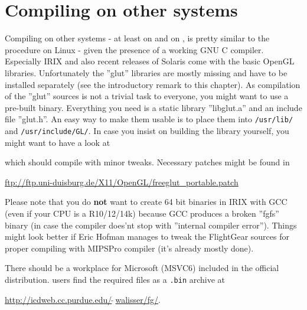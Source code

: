 \section{Compiling on other systems}

Compiling on other  systems - at least on  and on
, is pretty similar to the procedure on Linux - given the presence of a working GNU C compiler. Especially IRIX and also recent releases of Solaris come with the
basic OpenGL libraries. Unfortunately the ''glut'' libraries are
mostly missing and have to be installed separately (see the introductory remark to this chapter). As compilation
of the ''glut'' sources is not a trivial task to everyone, you might want to use a
pre-built binary. Everything you need is a static library ''libglut.a'' and an include
file ''glut.h''. An easy way to make them usable is to place them into \texttt{/usr/lib/}
and \texttt{/usr/include/GL/}. In case you insist on building the library yourself, you
might want to have a look at 
\medskip

 \medskip

 \noindent
which should compile with minor tweaks. Necessary patches might be found in
\medskip

\href{ftp://ftp.uni-duisburg.de/X11/OpenGL/freeglut_portable.patch}{ftp://ftp.uni-duisburg.de/X11/OpenGL/freeglut\_portable.patch}
 \medskip

 \noindent
Please note that you do \textbf{not} want to create 64 bit binaries in IRIX with
GCC (even if your CPU is a R10/12/14k) because GCC produces a broken ''fgfs'' binary (in
case the compiler does'nt stop with ''internal compiler error''). Things might look
better if Eric Hofman manages to tweak the FlightGear sources for
proper compiling with MIPSPro compiler (it's already mostly done).

There should be a workplace for Microsoft  (MSVC6) included in the official
\FlightGear{} distribution.  users find the required 
files as a \texttt{.bin} archive at
 \medskip

\href{http://icdweb.cc.purdue.edu/~walisser/fg/}{http://icdweb.cc.purdue.edu/$\tilde{~~}$walisser/fg/}.

